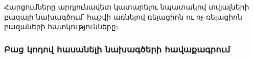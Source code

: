 {
    Հարցումները արդյունավետ կատարելու նպատակով տվյալների բազայի նախագծում՝ հաշվի առնելով ռելացիոն ու ոչ ռելացիոն բազաների հատկությունները։

    \subsubsection{Բաց կոդով հասանելի նախագծերի հավաքագրում}
}